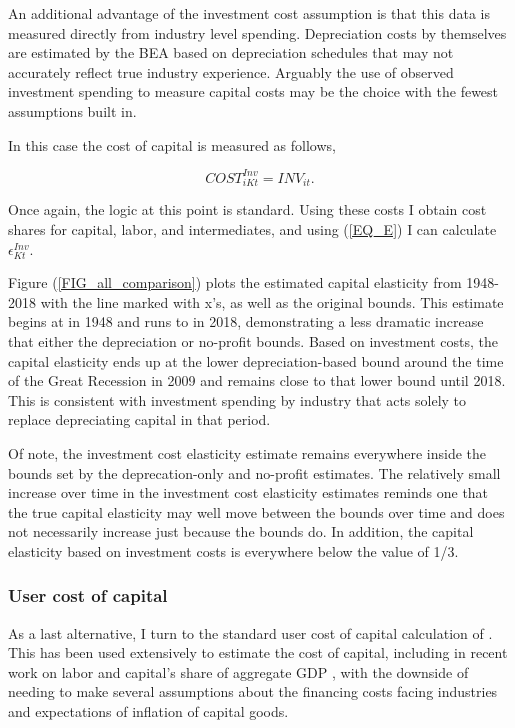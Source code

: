 \documentclass[11pt]{article}
\begin{document}
An additional advantage of the investment cost assumption is that this data is measured directly from industry level spending. Depreciation costs by themselves are estimated by the BEA based on depreciation schedules that may not accurately reflect true industry experience. Arguably the use of observed investment spending to measure capital costs may be the choice with the fewest assumptions built in.

In this case the cost of capital is measured as follows,

\begin{equation}
	COST^{Inv}_{iKt} = INV_{it}. 
\end{equation}

Once again, the logic at this point is standard. Using these costs I obtain cost shares for capital, labor, and intermediates, and using (\ref{EQ_E}) I can calculate $\epsilon_{Kt}^{Inv}$. 

Figure (\ref{FIG_all_comparison}) plots the estimated capital elasticity from 1948-2018 with the line marked with x's, as well as the original bounds. This estimate begins at \basefirstinv in 1948 and runs to \baselastinv in 2018, demonstrating a less dramatic increase that either the depreciation or no-profit bounds. Based on investment costs, the capital elasticity ends up at the lower depreciation-based bound around the time of the Great Recession in 2009 and remains close to that lower bound until 2018. This is consistent with investment spending by industry that acts solely to replace depreciating capital in that period.

Of note, the investment cost elasticity estimate remains everywhere inside the bounds set by the deprecation-only and no-profit estimates. The relatively small increase over time in the investment cost elasticity estimates reminds one that the true capital elasticity may well move between the bounds over time and does not necessarily increase just because the bounds do. In addition, the capital elasticity based on investment costs is everywhere below the value of 1/3.

\subsubsection{User cost of capital}
As a last alternative, I turn to the standard user cost of capital calculation of \cite{halljorg1967}. This has been used extensively to estimate the cost of capital, including in recent work on labor and capital's share of aggregate GDP \citep{Barkai000}, with the downside of needing to make several assumptions about the financing costs facing industries and expectations of inflation of capital goods. 
\end{document}
